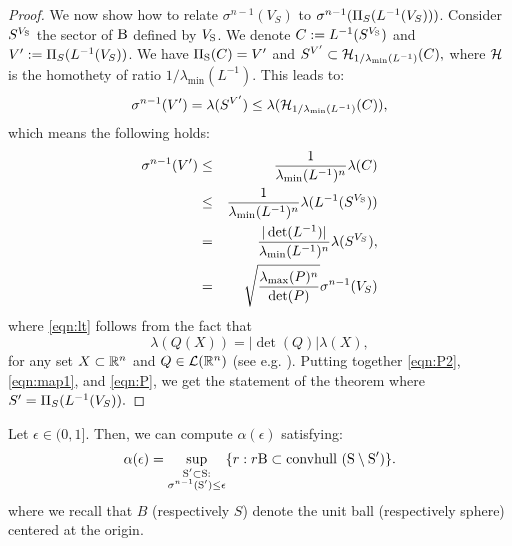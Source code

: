 \begin{proof}

We now show how to relate $\sigma^{n-1}(V_S)$ to $\sigma^{n-1}(\Pi_S(L^{-1}(V_S)))$. Consider $S^{V_{\text{S}}}$ the sector of $\text{B}$ defined by $V_{\text{S}}$. We denote $C:= L^{-1}(S^{V_{\text{S}}})$ and $V':=\Pi_S(L^{-1}(V_S))$. We have $\Pi_{\text{S}}(C) = V'$ and $S^{V'} \subset \mathcal{H}_{1/ \lambda_{\min}(L^{-1})}(C),$
where $\mathcal{H}$ is the homothety of ratio $1/ \lambda_{\min}(L^{-1})$. This leads to:
$$\sigma^{n-1}(V') = \lambda(S^{V'}) \leq \lambda (\mathcal{H}_{1/ \lambda_{\min}(L^{-1})}(C)),$$ which means the following holds:
\begin{eqnarray}\nonumber\sigma^{n-1}(V') &\leq& \frac{1}{\lambda_{\min}(L^{-1})^n}\lambda(C) \\
\nonumber &\leq&\frac{1}{\lambda_{\min}(L^{-1})^n} \lambda( L^{-1}(S^{V_{\text{S}}}))\\ 
\label{eqn:lt} &=&\frac{|\det(L^{-1})|}{\lambda_{\min}(L^{-1})^n}\lambda(S^{V_S}),\\
 \label{eqn:map1} &=&\sqrt{\frac{\lambda_{\max}(P)^n}{\det(P)}}\sigma^{n-1}(V_S)
\end{eqnarray}
where \eqref{eqn:lt} follows from the fact that
$$ \lambda(Q(X)) = |\det(Q)| \lambda(X),$$
for any set $X \subset \mathbb{R}^n$ and $Q \in \mathcal{L}(\mathbb{R}^n)$ (see e.g. \cite{rudin}).
Putting together \eqref{eqn:P2}, \eqref{eqn:map1}, and \eqref{eqn:P}, we get the statement of the theorem where $S' = \Pi_S(L^{-1}(V_S)).$
\end{proof}


\begin{lemma}\label{lemma:eps}Let $\epsilon \in (0, 1]$. Then, we can compute $\alpha(\epsilon)$ satisfying:
\begin{equation}\label{eqn:ballinc}\alpha(\epsilon) = \sup_{\substack{\text{S}' \subset \text{S}: \\  \sigma^{n-1}(\text{S}') \leq \epsilon}}\{r: r\text{B} \subset \mbox{convhull }(\text{S} \setminus \text{S}')\}.
\end{equation}
where we recall that $B$ (respectively $S$) denote the unit ball (respectively sphere) centered at the origin.
\end{lemma}


